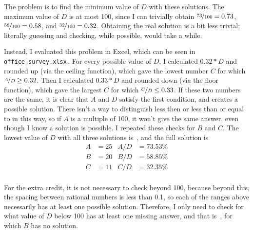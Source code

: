 \documentclass{article}
\begin{document}
The problem is to find the minimum value of $D$ with these solutions.
The maximum value of $D$ is at most 100, since I can trivially obtain $\nicefrac{73}{100}=0.73$, $\nicefrac{58}{100}=0.58$, and  $\nicefrac{32}{100}=0.32$.
Obtaining the real solution is a bit less trivial; literally guessing and checking, while possible, would take a while.

Instead, I evaluated this problem in Excel, which can be seen in \texttt{office\_survey.xlsx}\,.
For every possible value of $D$, I calculated $0.32*D$ and rounded up (via the ceiling function), which gave the lowest number $C$ for which $\nicefrac{A}{D}\geq0.32$.
Then I calculated $0.33*D$ and rounded down (via the floor function), which gave the largest $C$ for which $\nicefrac{C}{D}\leq0.33$.
If these two numbers are the same, it is clear that $A$ and $D$ satisfy the first condition, and creates a possible solution.
There isn't a way to distinguish less then or less than or equal to in this way, so if $A$ is a multiple of 100, it won't give the same answer, even though I know a solution is possible.
I repeated these checks for $B$ and $C$.
The lowest value of $D$ with all three solutions is
\,,
and the full solution is
\begin{align*}
A&=25 &A/D&=73.53\% \\
B&=20 &B/D&=58.85\% \\
C&=11 &C/D&=32.35\% \\
\end{align*}

For the extra credit, it is not necessary to check beyond 100, because beyond this, the spacing between rational numbers is less than 0.1, so each of the ranges above necessarily has at least one possible solution.
Therefore, I only need to check for what value of $D$ below 100 has at least one missing answer, and that is
\,,
for which $B$ has no solution.
\end{document}
